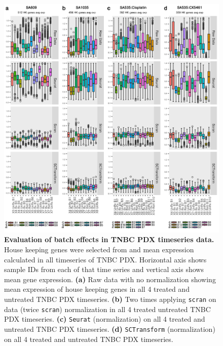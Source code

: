 \begin{figure}
\centering
\includegraphics[width=\textwidth]{Figures/chap5/Comparisonofbatcheffects.png}
	
\caption[Summary of overall read count of the data presented.]
	{\small
	\textbf{Evaluation of batch effects in TNBC PDX timeseries data.}
	  House keeping genes were selected from \cite{lin2019evaluating} and mean expression calculated in all timeseries of TNBC PDX. Horizontal axis shows sample IDs from each of that time series and vertical axis shows mean gene expression.
	   \textbf{(a)} Raw data with no normalization showing mean expression of house keeping genes in all 4 treated and untreated TNBC PDX timeseries. 
	    \textbf{(b)} Two times applying \texttt{scran} on data (twice \texttt{scran}) normalization  in all 4 treated untreated TNBC PDX timeseries.
	    \textbf{(c)} \texttt{Seurat} (normalization) on  all 4 treated and untreated TNBC PDX timeseries.
	    \textbf{(d)} \texttt{SCTransform} (normalization) on  all 4 treated and  untreated TNBC PDX timeseries.
	}
	\label{fig:Comparisonofbatcheffects}
\end{figure}




